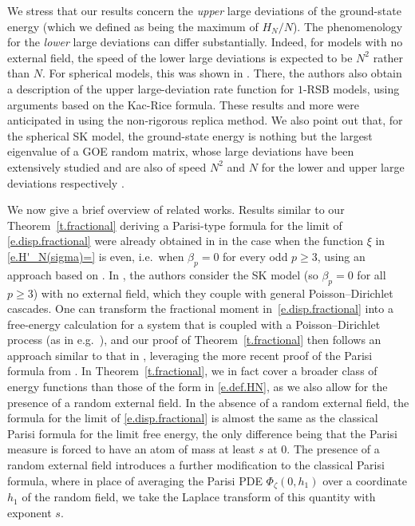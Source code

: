 \documentclass[11pt]{amsart}
\theoremstyle{remark}
\theoremstyle{definition}
\numberwithin{equation}{section}
\numberwithin{proposition}{section}
\numberwithin{figure}{section}
\numberwithin{table}{section}
\renewcommand{\ge}{\geqslant}
\newcommand{\1}{\mathbf{1}}
\begin{document}
We stress that our results concern the \emph{upper} large deviations of the ground-state energy (which we defined as being the maximum of $H_N/N$). The phenomenology for the \emph{lower} large deviations can differ substantially. Indeed, for models with no external field, the speed of the lower large deviations is expected to be $N^2$ rather than $N$. For spherical models, this was shown in \cite{huang2023constructive}. There, the authors also obtain a description of the upper large-deviation rate function for $1$-RSB models, using arguments based on the Kac-Rice formula. These results and more were anticipated in \cite{lacroix2024replica} using the non-rigorous replica method. We also point out that, for the spherical SK model, the ground-state energy is nothing but the largest eigenvalue of a GOE random matrix, whose large deviations have been extensively studied and are also of speed $N^2$ and $N$ for the lower and upper large deviations respectively \cite{benarous2001aging, benarous1997large}. 

We now give a brief overview of related works. Results similar to our Theorem~\ref{t.fractional} deriving a Parisi-type formula for the limit of \eqref{e.disp.fractional} were already obtained in \cite{talagrand2007large} in the case when the function $\xi$ in \eqref{e.H'_N(sigma)=} is even, i.e.\ when $\beta_p = 0$ for every odd $p \ge 3$, using an approach based on \cite{guerra2001sum, Tpaper}. In \cite{conmin}, the authors consider the SK model (so $\beta_p = 0$ for all $p \ge 3$) with no external field, which they couple with general Poisson--Dirichlet cascades. One can transform the fractional moment in~\eqref{e.disp.fractional} into a free-energy calculation for a system that is coupled with a Poisson--Dirichlet process (as in e.g.\ \cite[Proposition~5.20]{dominguez2024book}), and our proof of Theorem~\ref{t.fractional} then follows an approach similar to that in \cite{conmin}, leveraging the more recent proof of the Parisi formula from \cite{pan.aom, pan}. In Theorem~\ref{t.fractional}, we in fact cover a broader class of energy functions than those of the form in \eqref{e.def.HN}, as we also allow for the presence of a random external field. In the absence of a random external field, the formula for the limit of \eqref{e.disp.fractional} is almost the same as the classical Parisi formula for the limit free energy, the only difference being that the Parisi measure is forced to have an atom of mass at least $s$ at $0$. The presence of a random external field introduces a further modification to the classical Parisi formula, where in place of averaging the Parisi PDE $\Phi_{\zeta}(0,h_1)$ over a coordinate $h_1$ of the random field, we take the Laplace transform of this quantity with exponent $s$.
\end{document}
